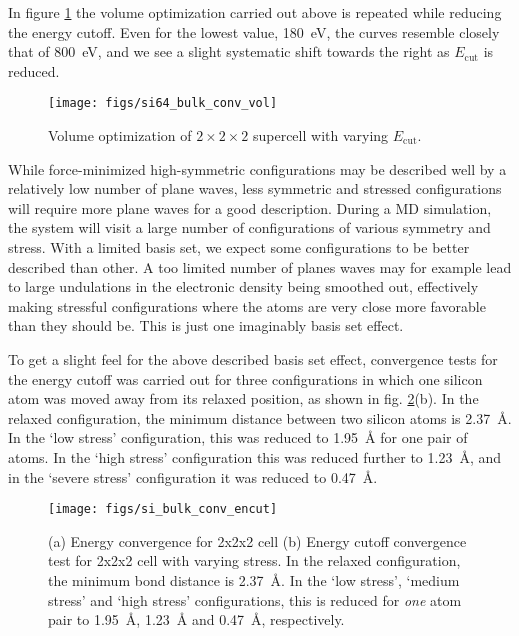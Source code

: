 \documentclass[11pt,bibliography=totoc,index=totoc]{scrbook}   %
\begin{document}
In figure \ref{fig:figs/si64_bulk_conv_vol} the volume optimization carried out above is repeated while reducing the 
energy cutoff. Even for the lowest value, \SI{180}{\electronvolt}, the curves resemble closely that of \SI{800}{\electronvolt},
and we see a slight systematic shift towards the right as $E_{\text{cut}}$ is reduced.
\begin{figure}[htbp]
  \begin{center}
    \texttt{[image: figs/si64\_bulk\_conv\_vol]}
  \end{center}
  \caption{
  Volume optimization of $2\times2\times2$ supercell with varying $E_{\text{cut}}$.
  }
  \label{fig:figs/si64_bulk_conv_vol}
\end{figure}

While force-minimized high-symmetric configurations may be described well by a relatively low number of plane waves, 
less symmetric and stressed configurations will require more plane waves for a good description. 
During a MD simulation, the system will visit a large number of configurations of various symmetry and stress. 
With a limited basis set, we expect some configurations to be better described than other. 
A too limited number of planes waves may for example lead to large undulations in the electronic density being smoothed out, 
effectively making stressful configurations where the atoms are very close more favorable than they should be. 
This is just one imaginably basis set effect.

To get a slight feel for the above described basis set effect, convergence tests for the energy cutoff was carried out for 
three configurations in which one silicon atom was moved away from its relaxed position, as shown in fig. \ref{fig:figs/si64_bulk_conv_encut_stress}(b).
In the relaxed configuration, the minimum distance between two silicon atoms is \SI{2.37}{\angstrom}. 
In the `low stress' configuration, this was reduced to \SI{1.95}{\angstrom} for one pair of atoms. 
In the `high stress' configuration this was reduced further to \SI{1.23}{\angstrom}, and in the `severe stress' configuration it was reduced to \SI{0.47}{\angstrom}.

\begin{figure}[htbp]
  \begin{center}
    \texttt{[image: figs/si\_bulk\_conv\_encut]}
  \end{center}
  \caption{
  (a) Energy convergence for 2x2x2 cell
  (b) Energy cutoff convergence test for 2x2x2 cell with varying stress. In the relaxed configuration, the minimum bond distance
  is \SI{2.37}{\angstrom}. In the `low stress', `medium stress' and `high stress' configurations, this is reduced for 
  \emph{one} atom pair to \SI{1.95}{\angstrom}, \SI{1.23}{\angstrom} and \SI{0.47}{\angstrom}, respectively.}
  \label{fig:figs/si64_bulk_conv_encut_stress}
\end{figure}
\end{document}
